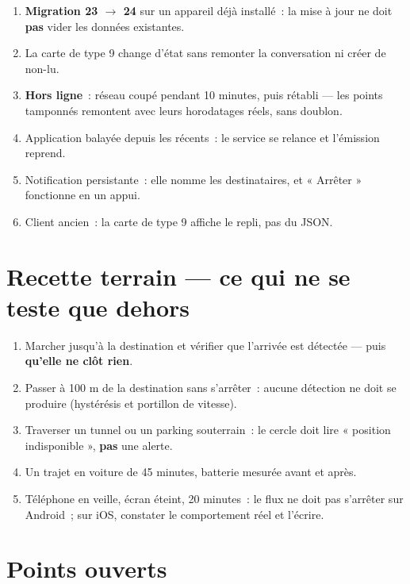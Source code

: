 \begin{enumerate}[leftmargin=1.6em]
  \item \textbf{Migration 23 $\rightarrow$ 24} sur un appareil déjà installé~: la mise à jour
        ne doit \textbf{pas} vider les données existantes.
  \item La carte de type 9 change d'état sans remonter la conversation ni créer de non-lu.
  \item \textbf{Hors ligne}~: réseau coupé pendant 10 minutes, puis rétabli --- les points
        tamponnés remontent avec leurs horodatages réels, sans doublon.
  \item Application balayée depuis les récents~: le service se relance et l'émission reprend.
  \item Notification persistante~: elle nomme les destinataires, et « Arrêter » fonctionne
        en un appui.
  \item Client ancien~: la carte de type 9 affiche le repli, pas du JSON.
\end{enumerate}

\section{Recette terrain --- ce qui ne se teste que dehors}

\begin{enumerate}[leftmargin=1.6em]
  \item Marcher jusqu'à la destination et vérifier que l'arrivée est détectée --- puis
        \textbf{qu'elle ne clôt rien}.
  \item Passer à 100 m de la destination sans s'arrêter~: aucune détection ne doit se
        produire (hystérésis et portillon de vitesse).
  \item Traverser un tunnel ou un parking souterrain~: le cercle doit lire « position
        indisponible », \textbf{pas} une alerte.
  \item Un trajet en voiture de 45 minutes, batterie mesurée avant et après.
  \item Téléphone en veille, écran éteint, 20 minutes~: le flux ne doit pas s'arrêter sur
        Android~; sur iOS, constater le comportement réel et l'écrire.
\end{enumerate}

\section{Points ouverts}

